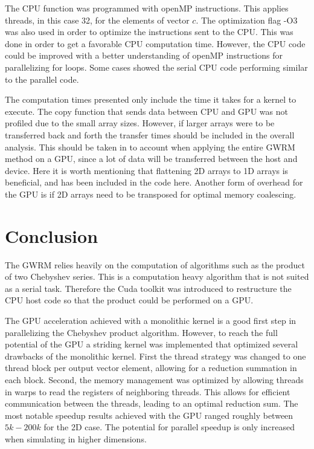 \documentclass{article}
\begin{document}
The CPU function was programmed with openMP instructions. This applies threads, in this case 32, for the elements of vector $c$. The optimization flag -O3 was also used in order to optimize the instructions sent to the CPU. This was done in order to get a favorable CPU computation time. However, the CPU code could be improved with a better understanding of openMP instructions for parallelizing for loops. Some cases showed the serial CPU code performing similar to the parallel code. 

The computation times presented only include the time it takes for a kernel to execute. The copy function that sends data between CPU and GPU was not profiled due to the small array sizes. However, if larger arrays were to be transferred back and forth the transfer times should be included in the overall analysis. This should be taken in to account when applying the entire GWRM method on a GPU, since a lot of data will be transferred  between the host and device. Here it is worth mentioning that flattening 2D arrays to 1D arrays is beneficial, and has been included in the code here. Another form of overhead for the GPU is if 2D arrays need to be transposed for optimal memory coalescing. 

\section{Conclusion}
The GWRM relies heavily on the computation of algorithms such as the product of two Chebyshev series. This is a computation heavy algorithm that is not suited as a serial task. Therefore the Cuda toolkit was introduced to restructure the CPU host code so that the product could be performed on a GPU. 

The GPU acceleration achieved with a monolithic kernel is a good first step in parallelizing the Chebyshev product algorithm. However, to reach the full potential of the GPU a striding kernel was implemented that optimized several drawbacks of the monolithic kernel. First the thread strategy was changed to one thread block per output vector element, allowing for a reduction summation in each block. Second, the memory management was optimized by allowing threads in warps to read the registers of neighboring threads. This allows for efficient communication between the threads, leading to an optimal reduction sum. The most notable speedup results achieved with the GPU ranged roughly between $5k - 200k$ for the 2D case. The potential for parallel speedup is only increased when simulating in higher dimensions. 
\end{document}
